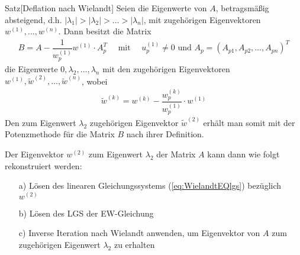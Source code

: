 \begin{colbox}{Satz}[Deflation nach Wielandt]
  Seien die Eigenwerte von $A$, betragsmäßig absteigend, d.h. 
  $|\lambda_1|>|\lambda_2|>\dots>|\lambda_n|$, mit zugehörigen Eigenvektoren $w^{(1)},\dots,w^{(n)}$.
  Dann besitzt die Matrix 
  \begin{align*}
    B 
    = A - \dfrac{1}{w_p^{(1)}} w^{(1)}\cdot A_p^T
    \quad\text{ mit }\quad u_p^{(1)}
    \neq 0 
    \text{ und } A_p=(A_{p1},A_{p2},\dots,A_{pn})^T
  \end{align*}
  die Eigenwerte $0,\lambda_2,\dots,\lambda_n$ mit den zugehörigen Eigenvektoren 
  $w^{(1)},\tilde{w}^{(2)},\dots,\tilde{w}^{(n)}$, wobei
  \begin{align*}
    \tilde{w}^{(k)} 
    = w^{(k)} - \dfrac{w_p^{(k)}}{w_p^{(1)}}\cdot w^{(1)}
    \tag{*}\label{eq:WielandtEQlgs}
  \end{align*}
  Den zum Eigenwert $\lambda_2$ zugehörigen Eigenvektor $\tilde{w}^{(2)}$ erhält man somit mit der 
  Potenzmethode für die Matrix $B$ nach ihrer Definition. 

  Der Eigenvektor $w^{(2)}$ zum Eigenwert $\lambda_2$ der Matrix $A$ kann dann wie folgt rekonstruiert werden:
  \begin{enumerate}
    \item[a)] Lösen des linearen Gleichungssystems (\ref{eq:WielandtEQlgs}) bezüglich $w^{(2)}$ 
    \item[b)] Lösen des LGS der EW-Gleichung  
    \item[c)] Inverse Iteration nach Wielandt anwenden, um Eigenvektor von $A$ zum zugehörigen Eigenwert
    $\lambda_2$ zu erhalten 
  \end{enumerate}
\end{colbox}

